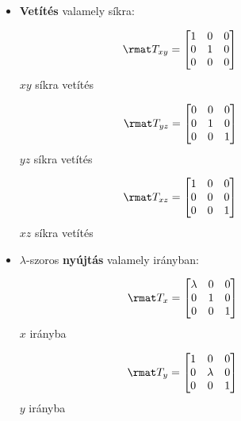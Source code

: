 \documentclass[a4paper, 12pt]{scrartcl}
\begin{document}
\begin{blueBox}
\begin{itemize}
    \item \textbf{Vetítés} valamely síkra:
          \vspace{-11mm}
          \begin{multicols}{3}
            \centering
            $$
              \rmat T_{xy} = \begin{bmatrix}
                1 & 0 & 0 \\
                0 & 1 & 0 \\
                0 & 0 & 0
              \end{bmatrix}
              \phantom{= \rmat T_{xy}}
            $$
            $xy$ síkra vetítés

            $$
              \rmat T_{yz} = \begin{bmatrix}
                0 & 0 & 0 \\
                0 & 1 & 0 \\
                0 & 0 & 1
              \end{bmatrix}
              \phantom{= \rmat T_{yz}}
            $$
            $yz$ síkra vetítés

            $$
              \rmat T_{xz} = \begin{bmatrix}
                1 & 0 & 0 \\
                0 & 0 & 0 \\
                0 & 0 & 1
              \end{bmatrix}
              \phantom{= \rmat T_{xz}}
            $$
            $xz$ síkra vetítés
          \end{multicols}
          \vspace{-3mm}

    \item $\lambda$-szoros \textbf{nyújtás} valamely irányban:
          \vspace{-11mm}
          \begin{multicols}{3}
            \centering
            $$
              \rmat T_{x} = \begin{bmatrix}
                \lambda & 0 & 0 \\
                0       & 1 & 0 \\
                0       & 0 & 1
              \end{bmatrix}
              \phantom{= \rmat T_{x}}
            $$
            $x$ irányba

            $$
              \rmat T_{y} = \begin{bmatrix}
                1 & 0       & 0 \\
                0 & \lambda & 0 \\
                0 & 0       & 1
              \end{bmatrix}
              \phantom{= \rmat T_{y}}
            $$
            $y$ irányba


\end{multicols}
\end{itemize}
\end{blueBox}
\end{document}

